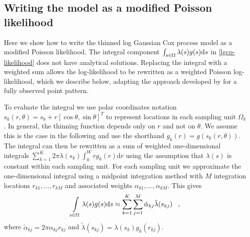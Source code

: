 \documentclass[preprint,12pt]{elsarticle}
\newcommand{\tl}{\tilde{\lambda}}   %
\begin{document}
\subsection{Writing the model as a modified Poisson likelihood}

Here we show how to write the thinned log Gaussian Cox process model as a modified Poisson likelihood.  The integral component $\int\displaylimits_{s \in \Omega} \lambda(s) g(s) \mathrm{d}s$ in \autoref{lgcp-likelihood} does not have analytical solutions.  Replacing the integral with a weighted sum allows the log-likelihood to be rewritten as a weighted Poisson log-likelihood, which we describe below, adapting the approach developed by \cite{simpson_going_2016} for a fully observed point pattern.

To evaluate the integral we use polar coordinates notation $s_k(r, \theta) = s_k + r\left[\cos\theta, \sin\theta \right]^T$ to represent locations in each sampling unit $\Omega_k$.   In general, the thinning function depends only on $r$ and not on $\theta$.  We assume this is the case in the following and use the shorthand $g_k(r) = g(s_k(r, \theta))$. The integral can then be rewritten as a sum of weighted one-dimensional integrals $\sum_{k=1}^K 2\pi \lambda(s_k) \int_0^W r g_k(r)\mathrm{d}r$ using the assumption that $\lambda(s)$ is constant within each sampling unit.  For each sampling unit we approximate the one-dimensional integral using a midpoint integration method with $M$ integration locations $r_{k1}, \ldots, r_{kM}$ and associated weights $\alpha_{k1}, \ldots, \alpha_{kM}$.  This gives
\begin{equation*}
	\int\displaylimits_{s \in \Omega} \lambda(s)g(s)\mathrm{d}s \approx \sum_{k=1}^K \sum_{j=1}^M \tilde{\alpha}_{kj} \tl(s_{kj}) \;\;\; ,
\end{equation*}
where $\tilde{\alpha}_{kj} = 2\pi \alpha_{kj}r_{kj}$ and $\tl(s_{kj}) = \lambda(s_k) g_k(r_{kj})$.
\end{document}
